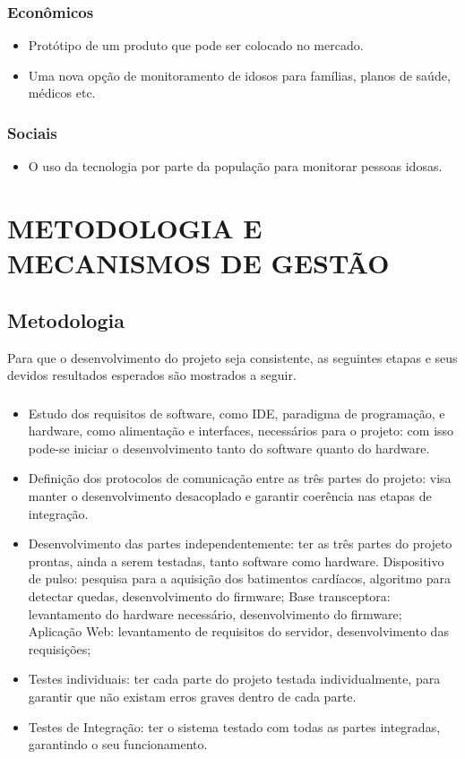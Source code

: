 \documentclass[a4paper]{article}
\begin{document}
\subsubsection{Econômicos}
\begin{itemize}
\item Protótipo de um produto que pode ser colocado no mercado.
\item Uma nova opção de monitoramento de idosos para famílias, planos de saúde, médicos etc.
\end{itemize}

\subsubsection{Sociais}
\begin{itemize}
\item O uso da tecnologia por parte da população para monitorar pessoas idosas.
\end{itemize}

\section{METODOLOGIA E MECANISMOS DE GESTÃO}

\subsection{Metodologia}
Para que o desenvolvimento do projeto seja consistente, as seguintes etapas e seus devidos resultados esperados são mostrados a seguir.

\subsubsection{}
\begin{itemize}
\item Estudo dos requisitos de software, como IDE, paradigma de programação, e hardware, como alimentação e interfaces, necessários para o projeto: com isso pode-se iniciar o desenvolvimento tanto do software quanto do hardware.
\item Definição dos protocolos de comunicação entre as três partes do projeto: visa manter o desenvolvimento desacoplado e garantir coerência nas etapas de integração.
\item Desenvolvimento das partes independentemente: ter as três partes do projeto prontas, ainda a serem testadas, tanto software como hardware.
\subitem Dispositivo de pulso: pesquisa para a aquisição dos batimentos cardíacos, algoritmo para detectar quedas, desenvolvimento do firmware;
\subitem Base transceptora: levantamento do hardware necessário, desenvolvimento do firmware;
\subitem Aplicação Web: levantamento de requisitos do servidor, desenvolvimento das requisições;
\item Testes individuais: ter cada parte do projeto testada individualmente, para garantir que não existam erros graves dentro de cada parte.
\item Testes de Integração: ter o sistema testado com todas as partes integradas, garantindo o seu funcionamento.
\end{itemize}
\end{document}
